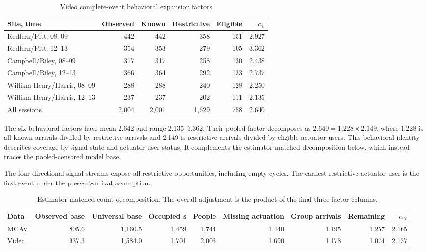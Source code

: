 \documentclass[11pt]{article}
\begin{document}
\begin{table}[htbp]
\centering
\caption{Video complete-event behavioral expansion factors}
\footnotesize
\begin{tabular}{lrrrrr}
\toprule
Site, time & Observed & Known & Restrictive & Eligible & \(\alpha_v\) \\
\midrule
Redfern/Pitt, 08--09 & 442 & 442 & 358 & 151 & 2.927 \\
Redfern/Pitt, 12--13 & 354 & 353 & 279 & 105 & 3.362 \\
Campbell/Riley, 08--09 & 317 & 317 & 258 & 130 & 2.438 \\
Campbell/Riley, 12--13 & 366 & 364 & 292 & 133 & 2.737 \\
William Henry/Harris, 08--09 & 288 & 288 & 240 & 128 & 2.250 \\
William Henry/Harris, 12--13 & 237 & 237 & 202 & 111 & 2.135 \\
\midrule
All sessions & 2{,}004 & 2{,}001 & 1{,}629 & 758 & 2.640 \\
\bottomrule
\end{tabular}
\end{table}

The six behavioral factors have mean 2.642 and range 2.135--3.362. Their pooled factor decomposes as \(2.640=1.228\times2.149\), where 1.228 is all known arrivals divided by restrictive arrivals and 2.149 is restrictive arrivals divided by eligible actuator users. This behavioral identity describes coverage by signal state and actuator-user status. It complements the estimator-matched decomposition below, which instead traces the pooled-censored model base.

The four directional signal streams expose all restrictive opportunities, including empty cycles. The earliest restrictive actuator user is the first event under the press-at-arrival assumption.

\begin{table}[htbp]
\centering
\caption{Estimator-matched count decomposition. The overall adjustment is the product of the final three factor columns.}
\label{tab:count-decomposition}
\scriptsize
\setlength{\tabcolsep}{3pt}
\begin{tabular}{@{}lrrrrrrrr@{}}
\toprule
Data & Observed base & Universal base & Occupied s & People & Missing actuation & Group arrivals & Remaining & \(\alpha_N\) \\
\midrule
MCAV & 805.6 & 1{,}160.5 & 1{,}459 & 1{,}744 & 1.440 & 1.195 & 1.257 & 2.165 \\
Video & 937.3 & 1{,}584.0 & 1{,}701 & 2{,}003 & 1.690 & 1.178 & 1.074 & 2.137 \\
\bottomrule
\end{tabular}
\end{table}
\end{document}

